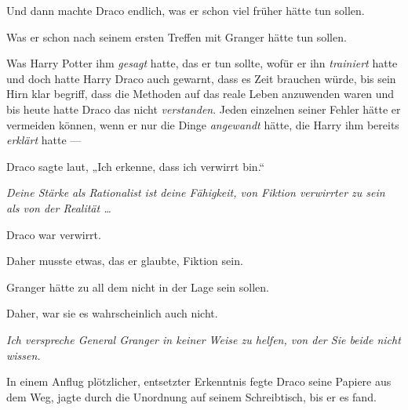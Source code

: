 Und dann machte Draco endlich, was er schon viel früher hätte tun sollen.

Was er schon nach seinem ersten Treffen mit Granger hätte tun sollen.

Was Harry Potter ihm \emph{gesagt} hatte, das er tun sollte, wofür er ihn \emph{trainiert} hatte und doch hatte Harry Draco auch gewarnt, dass es Zeit brauchen würde, bis sein Hirn klar begriff, dass die Methoden auf das reale Leben anzuwenden waren und bis heute hatte Draco das nicht \emph{verstanden}. Jeden einzelnen seiner Fehler hätte er vermeiden können, wenn er nur die Dinge \emph{angewandt} hätte, die Harry ihm bereits \emph{erklärt} hatte —

Draco sagte laut,
„Ich erkenne, dass ich verwirrt bin.“

\emph{Deine Stärke als Rationalist ist deine Fähigkeit, von Fiktion verwirrter zu sein als von der Realität …}

Draco war verwirrt.

Daher musste etwas, das er glaubte, Fiktion sein.

Granger hätte zu all dem nicht in der Lage sein sollen.

Daher, war sie es wahrscheinlich auch nicht.

\emph{Ich verspreche General Granger in keiner Weise zu helfen, von der Sie beide nicht wissen.}

In einem Anflug plötzlicher, entsetzter Erkenntnis fegte Draco seine Papiere aus dem Weg, jagte durch die Unordnung auf seinem Schreibtisch, bis er es fand.

